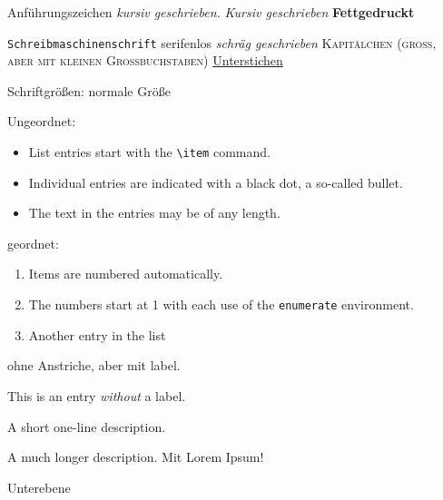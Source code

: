 \documentclass[a4paper, 12pt]{article}
\begin{document}
\glqq{}Anführungszeichen\grqq{}
\textit{kursiv geschrieben.}
\emph{Kursiv geschrieben}
\textbf{Fettgedruckt}

\texttt{Schreibmaschinenschrift}
\textsf{serifenlos}
\textsl{schräg geschrieben}
\textsc{Kapitälchen (groß, aber mit kleinen Großbuchstaben)}
\underline{Unterstichen}

Schriftgrößen:
\normalsize{normale Größe}
\tiny{}
\small{}
\large{}
\Large{}
\huge{}
\Huge{}






Ungeordnet:
\begin{itemize}
  \item List entries start with the \verb|\item| command.
  \item Individual entries are indicated with a black dot, a so-called bullet.
  \item The text in the entries may be of any length.
\end{itemize}

geordnet:
\begin{enumerate}
  \item Items are numbered automatically.
  \item The numbers start at 1 with each use of the \texttt{enumerate} environment.
  \item Another entry in the list
\end{enumerate}

ohne Anstriche, aber mit label.
\begin{description}
   \item This is an entry \textit{without} a label.
   \item[Something short] A short one-line description.
   \item[Something long] A much longer description. Mit Lorem Ipsum! \blindtext[1]
        \item Unterebene 
\end{description}
\end{document}
